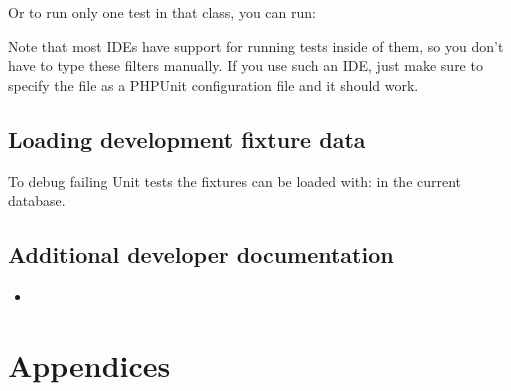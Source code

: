 \documentclass[a4paper,10pt,english,openany]{sphinxmanual}
\begin{document}
\sphinxAtStartPar
Or to run only one test in that class, you can run:

\begin{sphinxVerbatim}[commandchars=\\\{\}]
    \PYGZbs{}
\end{sphinxVerbatim}

\sphinxAtStartPar
Note that most IDEs have support for running tests inside of them, so you don’t
have to type these filters manually. If you use such an IDE, just make sure to
specify the  file as a PHPUnit configuration file and
it should work.


\subsection{Loading development fixture data}
\label{\detokenize{develop:loading-development-fixture-data}}
\sphinxAtStartPar
To debug failing Unit tests the fixtures can be loaded with:
 in the current database.


\subsection{Additional developer documentation}
\label{\detokenize{develop:additional-developer-documentation}}\begin{itemize}
\item {} 
\sphinxAtStartPar
{\hyperref[\detokenize{scoring:scoring}]{}}

\end{itemize}


\section{Appendices}
\label{\detokenize{index:appendices}}
\sphinxstepscope
\end{document}
